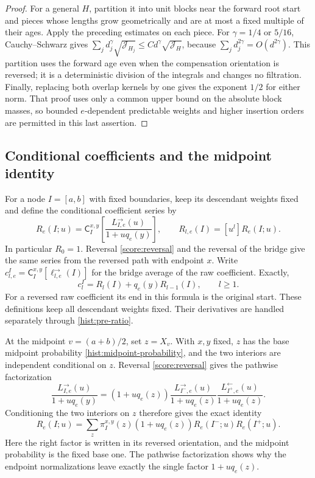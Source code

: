 \begin{proof}
For a general $H$, partition it into unit blocks near the forward root
start and pieces whose lengths grow geometrically and are at most a fixed
multiple of their ages.  Apply the preceding estimates on each piece.
For $\gamma=1/4$ or $5/16$, Cauchy--Schwarz gives
$\sum_jd_j^\gamma\sqrt{\mathcal J_{H_j}}
 \le C d^\gamma\sqrt{\mathcal J_H}$, because $\sum_jd_j^{2\gamma}=O(d^{2\gamma})$.
This partition uses the forward age even when the compensation orientation
is reversed; it is a deterministic division of the integrals and changes
no filtration.  Finally, replacing both overlap kernels by one gives
the exponent $1/2$ for either norm.  That proof uses only a common upper
bound on the absolute block masses, so bounded $e$-dependent predictable
weights and higher insertion orders are permitted in this last assertion.
\end{proof}

\subsection{Conditional coefficients and the midpoint identity}

For a node $I=[a,b]$ with fixed boundaries, keep its descendant weights
fixed and define the conditional coefficient series by
\begin{equation}\label{score:R-definition}
 R_e(I;u)=\mathsf C_I^{x,y}\left[
                   \frac{L_{I,e}^{\to}(u)}{1+u q_e(y)}\right],
 \qquad R_{l,e}(I)=[u^l]R_e(I;u).
\end{equation}
In particular $R_0=1$.  Reversal \eqref{score:reversal} and the reversal
of the bridge give the same series from the reversed path with endpoint
$x$.  Write $c_{l,e}^I=\mathsf C_I^{x,y}[\ell_{l,e}^{\to}(I)]$ for the
bridge average of the raw coefficient.  Exactly,
\begin{equation}\label{score:raw-conditional}
 c_l^I=R_l(I)+q_e(y)R_{l-1}(I),\qquad l\ge1.
\end{equation}
For a reversed raw coefficient its end in this formula is the original
start.  These definitions keep all descendant weights fixed.  Their
derivatives are handled separately through \eqref{hist:pre-ratio}.

At the midpoint $v=(a+b)/2$, set $z=X_v$.  With $x,y$ fixed, $z$ has the
base midpoint probability \eqref{hist:midpoint-probability}, and the two
interiors are independent conditional on $z$.  Reversal
\eqref{score:reversal} gives the pathwise factorization
\[
 \frac{L_{I,e}^{\to}(u)}{1+u q_e(y)}
 =(1+u q_e(z))
   \frac{L_{I^-,e}^{\to}(u)}{1+u q_e(z)}
   \frac{L_{I^+,e}^{\leftarrow}(u)}{1+u q_e(z)}.
\]
Conditioning the two interiors on $z$ therefore gives the exact identity
\begin{equation}\label{score:midpoint-series}
 R_e(I;u)=\sum_z\pi_I^{x,y}(z)(1+u q_e(z))
                     R_e(I^-;u)R_e(I^+;u).
\end{equation}
Here the right factor is written in its reversed orientation, and the
midpoint probability is the fixed base one.  The pathwise factorization
shows why the endpoint normalizations leave exactly the single factor
$1+u q_e(z)$.

